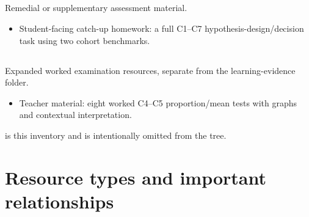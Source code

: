 \subsection{}

Remedial or supplementary assessment material.

\begin{itemize}
  \item {}

  Student-facing catch-up homework: a full C1–C7 hypothesis-design/decision task using two cohort benchmarks.
\end{itemize}

\subsection{}

Expanded worked examination resources, separate from the learning-evidence folder.

\begin{itemize}
  \item {}

  Teacher material: eight worked C4–C5 proportion/mean tests with graphs and contextual interpretation.
\end{itemize}

 is this inventory and is intentionally omitted from the tree.

\section{Resource types and important relationships}

